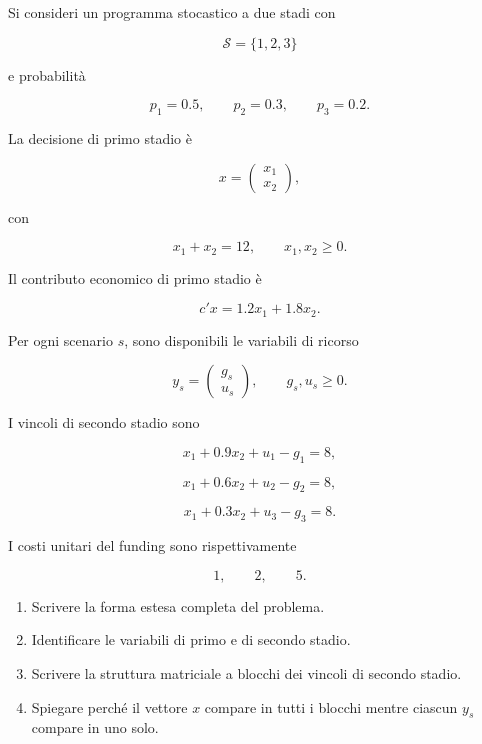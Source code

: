 \begin{exercise}

\label{ex:cap14-proposto-forma-estesa}

Si consideri un programma stocastico a due stadi con

\[
\mathcal S=\{1,2,3\}
\]

\noindent e probabilit\`a

\[
p_1=0.5,
\qquad
p_2=0.3,
\qquad
p_3=0.2.
\]

La decisione di primo stadio \`e

\[
x=
\begin{pmatrix}
x_1\\
x_2
\end{pmatrix},
\]

\noindent con

\[
x_1+x_2=12,
\qquad
x_1,x_2\geq0.
\]

Il contributo economico di primo stadio \`e

\[
c'x
=
1.2x_1+1.8x_2.
\]

Per ogni scenario $s$, sono disponibili le variabili di ricorso

\[
y_s=
\begin{pmatrix}
g_s\\
u_s
\end{pmatrix},
\qquad
g_s,u_s\geq0.
\]

I vincoli di secondo stadio sono

\[
x_1+0.9x_2+u_1-g_1=8,
\]

\[
x_1+0.6x_2+u_2-g_2=8,
\]

\[
x_1+0.3x_2+u_3-g_3=8.
\]

I costi unitari del funding sono rispettivamente

\[
1,
\qquad
2,
\qquad
5.
\]

\begin{enumerate}

\item Scrivere la forma estesa completa del problema.

\item Identificare le variabili di primo e di secondo stadio.

\item Scrivere la struttura matriciale a blocchi dei vincoli di secondo
stadio.

\item Spiegare perch\'e il vettore $x$ compare in tutti i blocchi mentre
ciascun $y_s$ compare in uno solo.


\end{enumerate}
\end{exercise}
